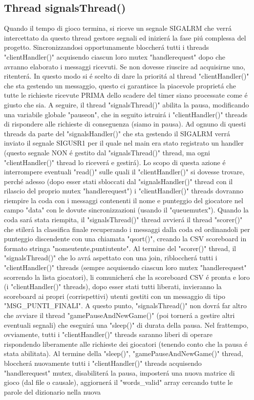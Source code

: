  \subsection{Thread signalsThread()}

Quando il tempo di gioco termina, si riceve un segnale SIGALRM che verr\'a intercettato da questo thread gestore segnali ed inizier\'a la fase pi\'u complessa del progetto. Sincronizzandosi opportunamente bloccher\'a tutti i threads "clientHandler()" acquisendo ciascun loro mutex "handlerequest" dopo che avranno elaborato i messaggi ricevuti. Se non dovesse riuscire ad acquisirne uno, ritenter\'a. In questo modo si \'e scelto di dare la priorit\'a al thread "clientHandler()" che sta gestendo un messaggio, questo ci garantisce la piacevole propriet\'a che tutte le richieste ricevute PRIMA dello scadere del timer siano processate come \'e giusto che sia. A seguire, il thread "signalsThread()" abilita la pausa, modificando una variabile globale "pauseon", che in seguito istruir\'a i "clientHandler()" threads di rispondere alle richieste di conseguenza (siamo in pausa). Ad ognuno di questi threads da parte del "signalsHandler()" che sta gestendo il SIGALRM verr\'a inviato il segnale SIGUSR1 per il quale nel main era stato registrato un handler (questo segnale NON \'e gestito dal "signalsThread()" thread, ma ogni "clientHandler()" thread lo ricever\'a e gestir\'a). Lo scopo di questa azione \'e interrompere eventuali "read()" sulle quali il "clientHandler()" si dovesse trovare, perch\'e adesso (dopo esser stati sbloccati dal "signalsHandler()" thread con il rilascio del proprio mutex "handlerequest") i "clientHandler()" threads dovranno riempire la coda con i messaggi contenenti il nome e punteggio del giocatore nel campo "data" con le dovute sincronizzazioni (usando il "queuemutex"). Quando la coda sar\'a stata riempita, il "signalsThread()" thread avvier\'a il thread "scorer()" che stiler\'a la classifica finale recuperando i messaggi dalla coda ed ordinandoli per punteggio discendente con una chiamata "qsort()", creando la CSV scoreboard in formato stringa "nomeutente,puntiutente". Al termine del "scorer()" thread, il "signalsThread()" che lo avr\'a aspettato con una join, ribloccher\'a tutti i "clientHandler()" threads (sempre acquisendo ciascun loro mutex "handlerequest" scorrendo la lista giocatori), li comunicher\'a che la scoreboard CSV \'e pronta e loro (i "clientHandler()" threads), dopo esser stati tutti liberati, invieranno la scoreboard ai propri (corrispettivi) utenti gestiti con un messaggio di tipo "MSG\_PUNTI\_FINALI". A questo punto, "signalsThread()" non dovr\'a far altro che avviare il thread "gamePauseAndNewGame()" (poi torner\'a a gestire altri eventuali segnali) che eseguir\'a una "sleep()" di durata della pausa. Nel frattempo, ovviamente, tutti i "clientHandler()" threads saranno liberi di operare rispondendo liberamente alle richieste dei giocatori (tenendo conto che la pausa \'e stata abilitata). Al termine della "sleep()", "gamePauseAndNewGame()" thread, bloccher\'a nuovamente tutti i "clientHandler()" threads acquisendo "handlerequest" mutex, disabiliter\'a la pausa, imposter\'a una nuova matrice di gioco (dal file o causale), aggiorner\'a il "words\_valid" array cercando tutte le parole del dizionario nella nuova 